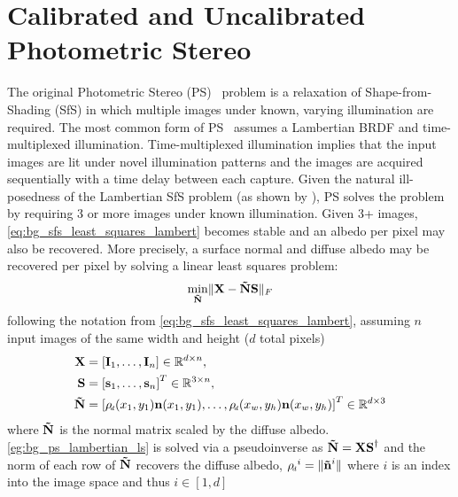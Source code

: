 \section{Calibrated and Uncalibrated Photometric Stereo}\label{sec:bg_ps}
The original Photometric Stereo (PS)~\cite{woodham1980photometric} problem
is a relaxation of Shape-from-Shading (SfS) in which multiple images under
known, varying illumination are required. The most common form of
PS~\cite{woodham1980photometric} assumes a Lambertian BRDF and time-multiplexed
illumination. Time-multiplexed illumination implies that the input images
are lit under novel illumination patterns and the images are acquired
sequentially with a time delay between each capture. Given the natural
ill-posedness of the Lambertian SfS problem (as shown by
), PS solves the problem by requiring
3 or more images under known illumination. Given 3+ images,
\cref{eq:bg_sfs_least_squares_lambert} becomes stable and an albedo per pixel
may also be recovered. More precisely, a surface normal and diffuse albedo
may be recovered per pixel by solving a linear least squares problem:
\begin{equation}\label{eg:bg_ps_lambertian_ls}
	 \min_{\boldsymbol{\mathbf{\tilde{N}}}} \lVert \boldsymbol{\mathbf{X}} - \boldsymbol{\mathbf{\tilde{N}}} \boldsymbol{\mathbf{S}} \rVert_F
\end{equation}
following the notation from \cref{eq:bg_sfs_least_squares_lambert},
assuming $n$ input images of the same width and height ($d$ total pixels)
\begin{align*}
	\bb{X} &= [\bb{I}_1, \ldots, \bb{I}_n] \in \R^{d \times n}, \\
	\bb{S} &= {[\bb{s}_1, \ldots, \bb{s}_n]}^T \in \R^{3 \times n}, \\
	\bb{\tilde{N}} &= {[\rho_{\smallsub{d}}(x_1, y_1)\bb{n}(x_1, y_1), \ldots, \rho_{\smallsub{d}}(x_w, y_h)\bb{n}(x_w, y_h)]}^T \in \R^{d \times 3}
\end{align*}
where $\boldsymbol{\mathbf{\tilde{N}}}$ is the normal matrix scaled by the diffuse
albedo. \cref{eg:bg_ps_lambertian_ls} is solved via a
pseudoinverse as $\boldsymbol{\mathbf{\tilde{N}}} = \boldsymbol{\mathbf{X}} \boldsymbol{\mathbf{S}}^{\dagger}$ and the norm of each
row of $\boldsymbol{\mathbf{\tilde{N}}}$ recovers the diffuse albedo,
${\rho_{\smallsub{d}}}^i = \norm{\bb{\tilde{n}}^i}$
where $i$ is an index into the image space and thus $i \in [1, d]$
